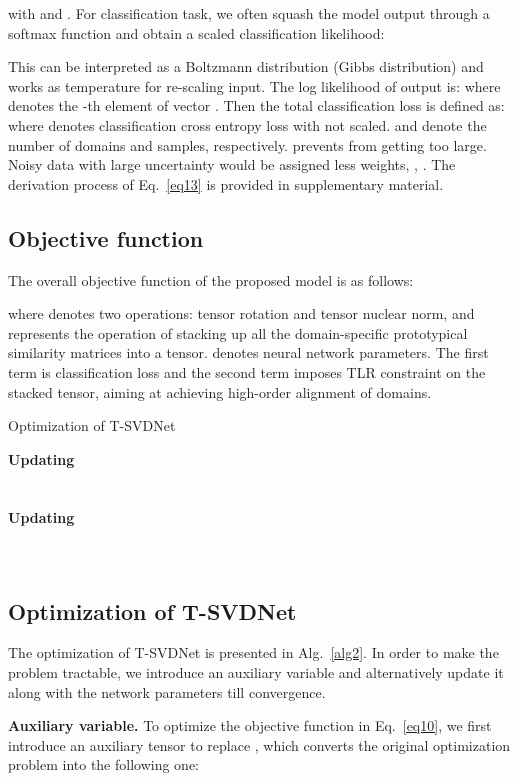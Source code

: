 \documentclass[10pt,twocolumn,letterpaper]{article}
\begin{document}
with  and . For classification task, we often squash the model output through a softmax function and obtain a scaled classification likelihood:

This can be interpreted as a Boltzmann distribution (Gibbs distribution) and  works as temperature for re-scaling input. The log likelihood of output is: 
{\small }where  denotes the -th element of vector . Then the total classification loss is defined as:
{\small }where  denotes classification cross entropy loss with  not scaled.  and  denote the number of domains and samples, respectively.  prevents  from getting too large. Noisy data with large uncertainty would be assigned less weights, \ie, . The derivation process of Eq.~\ref{eq13} is provided in supplementary material.\\

\subsection{Objective function}
\label{sec3.4}
The overall objective function of the proposed model is as follows:

where  denotes two operations: tensor rotation and tensor nuclear norm, and  represents the operation of stacking up all the domain-specific prototypical similarity matrices into a tensor.  denotes neural network parameters.
The first term is classification loss and the second term imposes TLR constraint on the stacked tensor, aiming at achieving high-order alignment of domains. \par
{\tiny \begin{algorithm}[!t]
	\caption{Optimization of T-SVDNet}\label{alg2}
	{	 \textbf{Updating} \\
		{ }\\
		 \\
		 \textbf{Updating} \\
		 \\
		\;
		\For{}{\;
				\;}
		 \\
		 \;
		
	}
\end{algorithm}}
\subsection{Optimization of T-SVDNet}
\label{sec3.5}
The optimization of T-SVDNet is presented in Alg.~\ref{alg2}. In order to make the problem tractable, we introduce an auxiliary variable and alternatively update it along with the network parameters till convergence.\par
\textbf{Auxiliary variable.} To optimize the objective function in Eq.~\ref{eq10}, we first introduce an auxiliary tensor  to replace , which converts the original optimization problem into the following one:  
\end{document}
